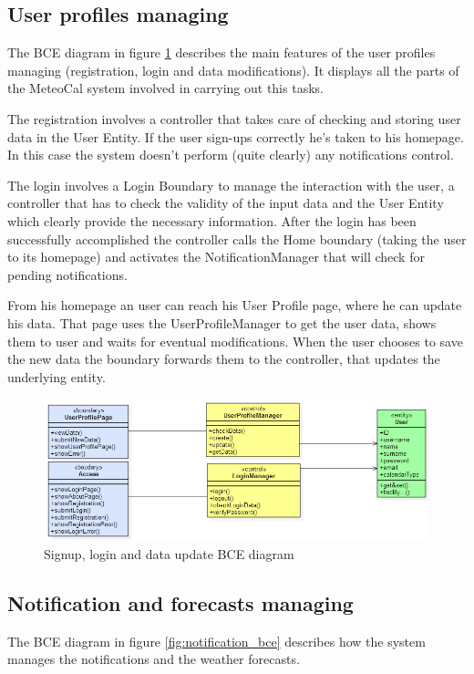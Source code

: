 \documentclass[10pt,a4paper,titlepage]{article}
\begin{document}
\subsection{User profiles managing}
The BCE diagram in figure \ref{fig:userProfile_bce} describes the main features of the user profiles managing (registration, login and data modifications). It displays all the parts of the MeteoCal system involved in carrying out this tasks.

The registration involves a controller that takes care of checking and storing user data in the User Entity. If the user sign-ups correctly he's taken to his homepage.  In this case the system doesn't perform  (quite clearly) any notifications control.

The login involves a Login Boundary to manage the interaction with the user, a controller that has to check the validity of the input data and the User Entity which clearly provide the necessary information. 
After the login has been successfully accomplished the controller calls the Home boundary (taking the user to its homepage) and activates the NotificationManager that will check for pending notifications.

From his homepage an user can reach his User Profile page, where he can update his data. That page uses the UserProfileManager to get the user data, shows them to user and waits for eventual modifications. When the user chooses to save the new data the boundary forwards them to the controller, that updates the underlying entity. 

\begin{figure}[h]
\centering
\includegraphics[width=\linewidth]{./bce/userProfile_bce}
\caption[user profile bce]{Signup, login and data update BCE diagram}
\label{fig:userProfile_bce}
\end{figure}

\subsection{Notification and forecasts managing}
The BCE diagram in figure \ref{fig:notification_bce} describes how the system manages the notifications and the weather forecasts.
\end{document}
